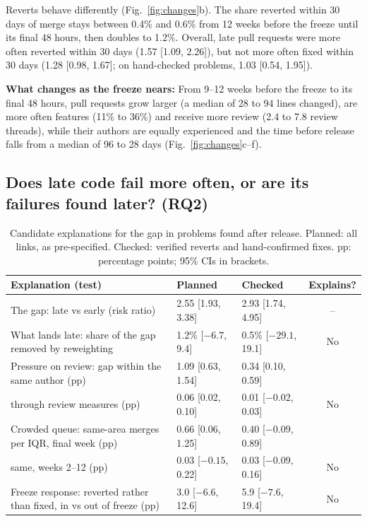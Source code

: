 \documentclass[10pt,conference]{IEEEtran}
\begin{document}
Reverts behave differently (Fig.~\ref{fig:changes}b). The share reverted within 30 days of merge stays between 0.4\% and 0.6\% from 12 weeks before the freeze until its final 48 hours, then doubles to 1.2\%. Overall, late pull requests were more often reverted within 30 days (1.57 [1.09, 2.26]), but not more often fixed within 30 days (1.28 [0.98, 1.67]; on hand-checked problems, 1.03 [0.54, 1.95]).

\textbf{What changes as the freeze nears:} From 9--12 weeks before the freeze to its final 48 hours, pull requests grow larger (a median of 28 to 94 lines changed), are more often features (11\% to 36\%) and receive more review (2.4 to 7.8 review threads), while their authors are equally experienced and the time before release falls from a median of 96 to 28 days (Fig.~\ref{fig:changes}c--f).

\subsection{Does late code fail more often, or are its failures found later? (RQ2)}

\begin{table}[t]
\caption{Candidate explanations for the gap in problems found after release. Planned: all links, as pre-specified. Checked: verified reverts and hand-confirmed fixes. pp: percentage points; 95\% CIs in brackets.}
\label{tab:explanations}
\centering
\footnotesize
\setlength{\tabcolsep}{2.5pt}
\begin{tabularx}{\columnwidth}{@{}>{\raggedright\arraybackslash}Xllc@{}}
\toprule
Explanation (test) & Planned & Checked & Explains? \\
\midrule
The gap: late vs early (risk ratio) & 2.55 [1.93, 3.38] & 2.93 [1.74, 4.95] & -- \\
What lands late: share of the gap removed by reweighting & 1.2\% [$-6.7$, 9.4] & 0.5\% [$-29.1$, 19.1] & No \\
Pressure on review: gap within the same author (pp) & 1.09 [0.63, 1.54] & 0.34 [0.10, 0.59] & \\
\quad through review measures (pp) & 0.06 [0.02, 0.10] & 0.01 [$-0.02$, 0.03] & No \\
Crowded queue: same-area merges per IQR, final week (pp) & 0.66 [0.06, 1.25] & 0.40 [$-0.09$, 0.89] & \\
\quad same, weeks 2--12 (pp) & 0.03 [$-0.15$, 0.22] & 0.03 [$-0.09$, 0.16] & No \\
Freeze response: reverted rather than fixed, in vs out of freeze (pp) & 3.0 [$-6.6$, 12.6] & 5.9 [$-7.6$, 19.4] & No \\
\bottomrule
\end{tabularx}
\end{table}
\end{document}
